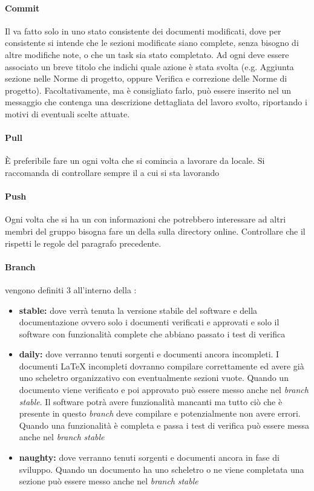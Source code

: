 \documentclass[12pt,a4paper]{article}
\begin{document}
\paragraph{Commit}
Il  va fatto solo in uno stato consistente dei documenti modificati, dove per consistente si intende che le sezioni modificate siano complete, senza bisogno di altre modifiche note, o che un task sia stato completato. Ad ogni  deve essere associato un breve titolo che indichi quale azione è stata svolta (e.g. Aggiunta sezione  nelle Norme di progetto, oppure Verifica e correzione delle Norme di progetto). Facoltativamente, ma è consigliato farlo, può essere inserito nel  un messaggio che contenga una descrizione dettagliata del lavoro svolto, riportando i motivi di eventuali scelte attuate.
\paragraph{Pull}
È preferibile fare un  ogni volta che si comincia a lavorare da locale. Si raccomanda di controllare sempre il  a cui si sta lavorando
\paragraph{Push}
Ogni volta che si ha un  con informazioni che potrebbero interessare ad altri membri del gruppo bisogna fare un  della  sulla directory online. Controllare che il  rispetti le regole del paragrafo precedente.

\paragraph{Branch} vengono definiti 3  all'interno della :
\begin{itemize}
	\item \textbf{stable:} dove verrà tenuta la versione stabile del software e della documentazione ovvero solo i documenti verificati e  approvati e solo il software con funzionalità complete che abbiano passato i test di verifica
	\item \textbf{daily:} dove verranno tenuti sorgenti e documenti ancora incompleti. I documenti \LaTeX{} incompleti dovranno compilare correttamente ed avere già uno scheletro organizzativo con eventualmente sezioni vuote. Quando un documento viene verificato e poi approvato può essere messo anche nel \textit{branch} \textit{stable}. Il software potrà avere funzionalità mancanti ma tutto ciò che è presente in questo \textit{branch} deve compilare e potenzialmente non avere errori. Quando una funzionalità è completa e passa i test di verifica può essere messa anche nel \textit{branch} \textit{stable}
	\item \textbf{naughty:} dove verranno tenuti sorgenti e documenti ancora in fase di sviluppo. Quando un documento ha uno scheletro o ne viene completata una sezione può essere messo anche nel \textit{branch} \textit{stable}
\end{itemize}
\end{document}
